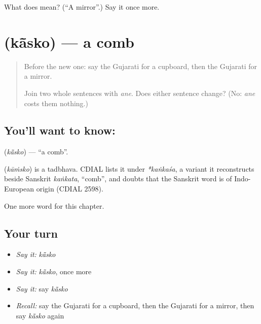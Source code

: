 \begin{tcolorbox}[breakable,colback=teal!4,colframe=teal!35!black,title={Before you move on}]
What does  mean? (\textquotedblleft{}A mirror\textquotedblright{}.) Say it once more.
\end{tcolorbox}
\section[\texorpdfstring{\gu{કાંસકો} (kā̃sko)}{કાંસકો (kā̃sko)}]{ (kā̃sko) — a comb}

\label{lesson:GU-C106-kasko}



\begin{quote}
Before the new one: say the Gujarati for a cupboard, then the Gujarati for a mirror.

Join two whole sentences with \emph{ane}. Does either sentence change? (No: \emph{ane} costs them nothing.)
\end{quote}

\subsection*{You'll want to know: }
\textbf{} (\emph{kā̃sko}) — \textquotedblleft{}a comb\textquotedblright{}.

\begin{cousinweb}
\textbf{} (\emph{kāṁsko}) is a tadbhava. CDIAL lists it under \emph{*kaṅkaśa}, a variant it reconstructs beside Sanskrit \emph{kaṅkata}, \textquotedblleft{}comb\textquotedblright{}, and doubts that the Sanskrit word is of Indo-European origin (CDIAL 2598).
\end{cousinweb}

\begin{grammarlens}[title={What you've built}]
One more word for this chapter.
\end{grammarlens}

\subsection*{Your turn}
\begin{itemize}
\raggedright
  \item \emph{Say it:} \emph{kā̃sko}
  \item \emph{Say it:} \emph{kā̃sko}, once more
  \item \emph{Say it:} say \emph{kā̃sko}
  \item \emph{Recall:} say the Gujarati for a cupboard, then the Gujarati for a mirror, then say \emph{kā̃sko} again
\end{itemize}

